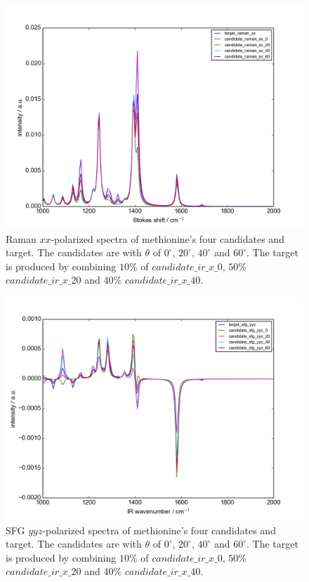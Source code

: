 \begin{figure}[!ht]
\centering
\includegraphics[scale=0.5]{Figures/Met_candidates_plotting_raman_xx.png}
\caption{Raman $xx$-polarized spectra of methionine's four candidates and target. The candidates are with $\theta$ of $0^{\circ}$, $20^{\circ}$, $40^{\circ}$ and $60^{\circ}$. The target is produced by combining $10\%$ of $candidate\_ir\_x\_0$, $50\%$ $candidate\_ir\_x\_20$ and $40\%$ $candidate\_ir\_x\_40$.} \label{fig:2.4}
\end{figure}

\begin{figure}[!ht]
\centering
\includegraphics[scale=0.5]{Figures/Met_candidates_plotting_sfg_yyz.png}
\caption{SFG $yyz$-polarized spectra of methionine's four candidates and target. The candidates are with $\theta$ of $0^{\circ}$, $20^{\circ}$, $40^{\circ}$ and $60^{\circ}$. The target is produced by combining $10\%$ of $candidate\_ir\_x\_0$, $50\%$ $candidate\_ir\_x\_20$ and $40\%$ $candidate\_ir\_x\_40$.} \label{fig:2.5}
\end{figure}

